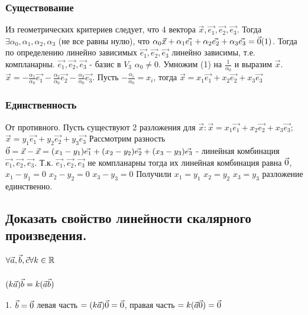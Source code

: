 \subsubsection{Существование}

Из геометрических критериев следует, что 4 вектора $\vec{x}, \vec{e_1}, \vec{e_2}, \vec{e_3}$.
Тогда $\exists \alpha_0, \alpha_1, \alpha_2, \alpha_3$ (не все равны нулю), что
$\alpha_0\vec{x} + \alpha_1\vec{e_1} + \alpha_2\vec{e_2} + \alpha_3\vec{e_3} = \vec{0} (1)$.
Тогда по определению линейно зависимых $\vec{e_1}, \vec{e_2}, \vec{e_3}$ линейно зависимы,
т.е. компланарны. $\vec{e_1}, \vec{e_2}, \vec{e_3}$ - базис в $V_3$ $\alpha_0 \ne 0$.
Умножим (1) на $\frac{1}{\alpha_0}$ и выразим $\vec{x}$. 
$\vec{x} = -\frac{\alpha_1}{\alpha_0}\vec{e_1}-\frac{\alpha_2}{\alpha_0}\vec{e_2}
-\frac{\alpha_3}{\alpha_0}\vec{e_3}$. Пусть $-\frac{\alpha_i}{\alpha_0} = x_i$, тогда
$\vec{x} = x_1\vec{e_1} + x_2\vec{e_2} + x_3\vec{e_3}$

\subsubsection{Единственность}

От противного. Пусть существуют 2 разложения для 
$\vec{x}: \vec{x} = x_1\vec{e_1} + x_2\vec{e_2} + x_3\vec{e_3};$
$\vec{x} = y_1\vec{e_1} + y_2\vec{e_2} + y_3\vec{e_3}$
Рассмотрим разность $\vec{0} = \vec{x} - \vec{x} = 
(x_1 - y_1)\vec{e_1} + (x_2 - y_2)\vec{e_2} + (x_3 - y_3)\vec{e_3}$ - линейная комбинация 
$\vec{e_1}, \vec{e_2}, \vec{e_3}$. Т.к. $\vec{e_1}, \vec{e_2}, \vec{e_3}$ не компланарны
тогда их линейная комбинация равна $\vec{0}$, $x_1 - y_1 = 0$ $x_2 - y_2 = 0$ $x_3 - y_3 = 0$
Получили $x_1 = y_1$ $x_2 = y_2$ $x_3 = y_3$ разложение единственно.

\subsection{Доказать свойство линейности скалярного произведения.}

\begin{center}
    $\forall \vec{a}, \vec{b}, \vec{c} \forall k \in \mathbb{R}$
\end{center}

\subsubsection{$(k\vec{a})\vec{b} = k(\vec{a}\vec{b})$}

1. $\vec{b} = \vec{0}$ левая часть $ = (k\vec{a})\vec{0} = \vec{0}$, правая часть $ = k(\vec{a}\vec{0}) = \vec{0}$

